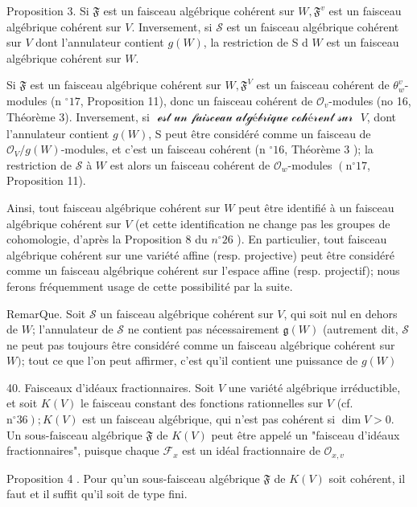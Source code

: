 Proposition $3 .$ Si $\mathfrak{F}$ est un faisceau algébrique cohérent sur $W, \mathfrak{F}^{v}$ est un faisceau algébrique cohérent sur $V$. Inversement, si $\mathcal{S}$ est un faisceau algébrique cohérent sur $V$ dont l'annulateur contient $g(W)$, la restriction de S d $W$ est un faisceau algébrique cohérent sur $W$.

Si $\mathfrak{F}$ est un faisceau algébrique cohérent sur $W, \mathfrak{F}^{V}$ est un faisceau cohérent de $\theta_{w}^{v}$-modules (n $^{\circ} 17$, Proposition 11), donc un faisceau cohérent de $\mathcal{O}_{v}$-modules (no 16, Théorème 3). Inversement, si $\mathcal{\text { est un faisceau algébrique cohérent sur }}$ $V$, dont l'annulateur contient $g(W)$, S peut être considéré comme un faisceau de $\mathcal{O}_{V} / g(W)$-modules, et c'est un faisceau cohérent (n $^{\circ} 16$, Théorème 3 ); la restriction de $\mathcal{S}$ à $W$ est alors un faisceau cohérent de $\mathcal{O}_{w}$-modules $\left(\mathrm{n}^{\circ} 17\right.$, Proposition 11).

Ainsi, tout faisceau algébrique cohérent sur $W$ peut être identifié à un faisceau algébrique cohérent sur $V$ (et cette identification ne change pas les groupes de cohomologie, d'après la Proposition 8 du $n^{\circ} 26$ ). En particulier, tout faisceau algébrique cohérent sur une variété affine (resp. projective) peut être considéré comme un faisceau algébrique cohérent sur l'espace affine (resp. projectif); nous ferons fréquemment usage de cette possibilité par la suite.

RemarQue. Soit $\mathcal{S}$ un faisceau algébrique cohérent sur $V$, qui soit nul en dehors de $W$; l'annulateur de $\mathcal{S}$ ne contient pas nécessairement $\mathfrak{g}(W)$ (autrement dit, $\mathcal{S}$ ne peut pas toujours être considéré comme un faisceau algébrique cohérent sur $W)$; tout ce que l'on peut affirmer, c'est qu'il contient une puissance de $g(W)$

40. Faisceaux d'idéaux fractionnaires. Soit $V$ une variété algébrique irréductible, et soit $K(V)$ le faisceau constant des fonctions rationnelles sur $V$ (cf. $\left.\mathrm{n}^{\circ} 36\right) ; K(V)$ est un faisceau algébrique, qui n'est pas cohérent si $\operatorname{dim} V>0$. Un sous-faisceau algébrique $\mathfrak{F}$ de $K(V)$ peut être appelé un "faisceau d'idéaux fractionnaires", puisque chaque $\mathcal{F}_{x}$ est un idéal fractionnaire de $\mathcal{O}_{x, v}$

Proposition 4 . Pour qu'un sous-faisceau algébrique $\mathfrak{F}$ de $K(V)$ soit cohérent, il faut et il suffit qu'il soit de type fini.

